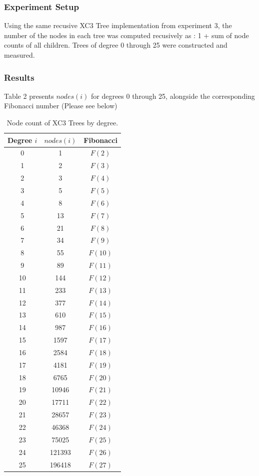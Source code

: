 \documentclass[letterpaper]{article}
\theoremstyle{plain}
\theoremstyle{definition}
\theoremstyle{remark}
\newcounter{experiment}
\begin{document}
\subsubsection*{Experiment Setup}
Using the same recusive XC3 Tree implementation from experiment 3, the number of the nodes in each tree was computed recusively
as : 1 + sum of node counts of all children. Trees of degree 0 through 25 were constructed and measured.

\subsubsection*{Results}
Table 2 presents $nodes(i)$ for degrees 0 through 25, alongside the corresponding Fibonacci number (Please see below)

\begin{table}[H]
\centering
\begin{tabular}{|c|c|c|}
\hline
\textbf{Degree $i$} & \textbf{$nodes(i)$} & \textbf{Fibonacci} \\
\hline
0  & 1      & $F(2)$  \\
1  & 2      & $F(3)$  \\
2  & 3      & $F(4)$  \\
3  & 5      & $F(5)$  \\
4  & 8      & $F(6)$  \\
5  & 13     & $F(7)$  \\
6  & 21     & $F(8)$  \\
7  & 34     & $F(9)$  \\
8  & 55     & $F(10)$ \\
9  & 89     & $F(11)$ \\
10 & 144    & $F(12)$ \\
11 & 233    & $F(13)$ \\
12 & 377    & $F(14)$ \\
13 & 610    & $F(15)$ \\
14 & 987    & $F(16)$ \\
15 & 1597   & $F(17)$ \\
16 & 2584   & $F(18)$ \\
17 & 4181   & $F(19)$ \\
18 & 6765   & $F(20)$ \\
19 & 10946  & $F(21)$ \\
20 & 17711  & $F(22)$ \\
21 & 28657  & $F(23)$ \\
22 & 46368  & $F(24)$ \\
23 & 75025  & $F(25)$ \\
24 & 121393 & $F(26)$ \\
25 & 196418 & $F(27)$ \\
\hline
\end{tabular}
\caption{Node count of XC3 Trees by degree.}
\label{tab:xc3nodes}
\end{table}
\end{document}
